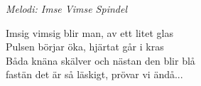 {\footnotesize\textit{Melodi: Imse Vimse Spindel}}\par
\vspace{10pt}
Imsig vimsig blir man, av ett litet glas\\
Pulsen börjar öka, hjärtat går i kras\\
Båda knäna skälver och nästan den blir blå\\
fastän det är så läskigt, prövar vi ändå...

